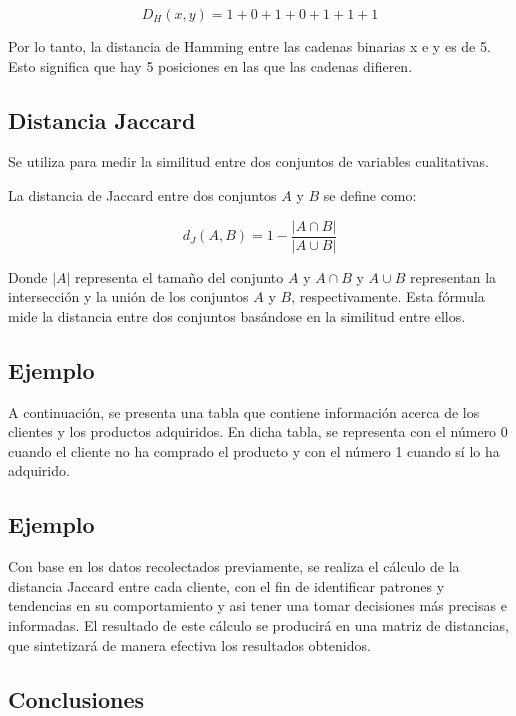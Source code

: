 \documentclass[
]{article}
\begin{document}
\[D_H(x, y) = 1 + 0 + 1 + 0 + 1 + 1 + 1\]

Por lo tanto, la distancia de Hamming entre las cadenas binarias x e y
es de 5. Esto significa que hay 5 posiciones en las que las cadenas
difieren.

\hypertarget{distancia-jaccard}{%
\subsection{Distancia Jaccard}\label{distancia-jaccard}}

Se utiliza para medir la similitud entre dos conjuntos de variables
cualitativas.

La distancia de Jaccard entre dos conjuntos \(A\) y \(B\) se define
como:

\[ d_J(A,B) = 1 - \frac{|A \cap B|}{|A \cup B|} \]

Donde \(|A|\) representa el tamaño del conjunto \(A\) y \(A \cap B\) y
\(A \cup B\) representan la intersección y la unión de los conjuntos
\(A\) y \(B\), respectivamente. Esta fórmula mide la distancia entre dos
conjuntos basándose en la similitud entre ellos.

\hypertarget{ejemplo-1}{%
\subsection{Ejemplo}\label{ejemplo-1}}

A continuación, se presenta una tabla que contiene información acerca de
los clientes y los productos adquiridos. En dicha tabla, se representa
con el número 0 cuando el cliente no ha comprado el producto y con el
número 1 cuando sí lo ha adquirido.

\hypertarget{ejemplo-2}{%
\subsection{Ejemplo}\label{ejemplo-2}}

Con base en los datos recolectados previamente, se realiza el cálculo de
la distancia Jaccard entre cada cliente, con el fin de identificar
patrones y tendencias en su comportamiento y asi tener una tomar
decisiones más precisas e informadas. El resultado de este cálculo se
producirá en una matriz de distancias, que sintetizará de manera
efectiva los resultados obtenidos.

\hypertarget{conclusiones}{%
\subsection{Conclusiones}\label{conclusiones}}
\end{document}
